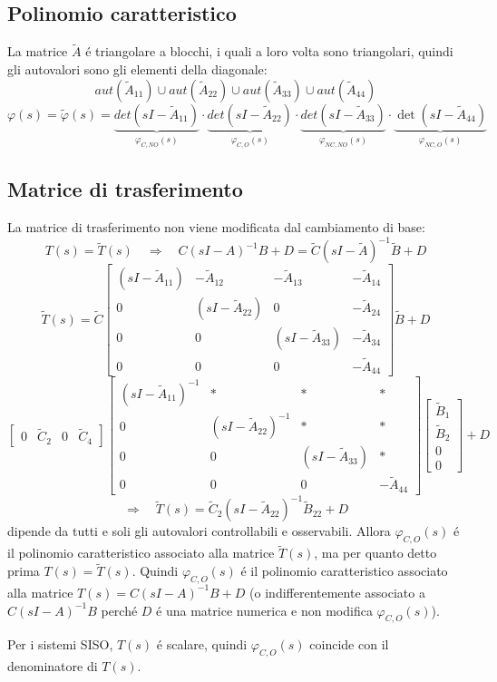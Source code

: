 \documentclass[../main.tex]{subfiles}
\begin{document}
	\subsection{Polinomio caratteristico}
		\label{sec:decomp_kalmann_polinomio}
		La matrice $ \tilde A $ \'e triangolare a blocchi, i quali a loro volta sono triangolari, quindi gli autovalori sono gli elementi della diagonale:
		\[
			aut(\tilde A_{11}) \cup aut(\tilde A_{22}) \cup aut(\tilde A_{33}) \cup aut(\tilde A_{44})
		\]
		\[
			\varphi(s) = \tilde \varphi(s) = \underbrace{det(sI-\tilde A_{11})}_{\varphi_{C,NO}(s)} \cdot \underbrace{det(sI-\tilde A_{22})}_{\varphi_{C,O}(s)} \cdot \underbrace{det(sI-\tilde A_{33})}_{\varphi_{NC,NO}(s)} \cdot \underbrace{\det(sI-\tilde A_{44})}_{\varphi_{NC,O}(s)}
		\]
		
	\subsection{Matrice di trasferimento}
		La matrice di trasferimento non viene modificata dal cambiamento di base:
		\[
			T(s) = \tilde T(s) \quad\Rightarrow\quad C(sI-A)^{-1}B+D = \tilde C(sI- \tilde A)^{-1} \tilde B + D
		\]
		\[
			\tilde T(s) = \tilde C
			\begin{bmatrix}
				(sI-\tilde A_{11}) & -\tilde A_{12} & -\tilde A_{13} & -\tilde A_{14}\\
				0 & (sI-\tilde A_{22}) & 0 & -\tilde A_{24}\\
				0 & 0 & (sI-\tilde A_{33}) & -\tilde A_{34}\\
				0 & 0 & 0 & -\tilde A_{44}
			\end{bmatrix} \tilde B + D
		\]
		\[
			\begin{bmatrix}
				0 & \tilde C_2 & 0 & \tilde C_4
			\end{bmatrix}
			\begin{bmatrix}
				(sI-\tilde A_{11})^{-1} & * & * & *\\
				0 & (sI-\tilde A_{22})^{-1} & * & *\\
				0 & 0 & (sI-\tilde A_{33}) & *\\
				0 & 0 & 0 & -\tilde A_{44}
			\end{bmatrix}
			\begin{bmatrix}
				\tilde B_1\\
				\tilde B_2\\
				0\\
				0
			\end{bmatrix} + D
		\]
		\[
			\Rightarrow\quad \tilde T(s) = \tilde C_2 (sI- \tilde A_{22})^{-1} \tilde B_{22} + D
		\]
		dipende da tutti e soli gli autovalori controllabili e osservabili. Allora $ \varphi_{C,O}(s) $ \'e il polinomio caratteristico associato alla matrice $ \tilde T(s) $, ma per quanto detto prima $ T(s) = \tilde T(s) $. Quindi $ \varphi_{C,O}(s) $ \'e il polinomio caratteristico associato alla matrice $ T(s) = C(sI-A)^{-1}B+D $ (o indifferentemente associato a $ C(sI-A)^{-1}B $ perch\'e $ D $ \'e una matrice numerica e non modifica $ \varphi_{C,O}(s) $).
		
		Per i sistemi SISO, $ T(s) $ \'e scalare, quindi $ \varphi_{C,O}(s) $ coincide con il denominatore di $ T(s) $.
\end{document}
